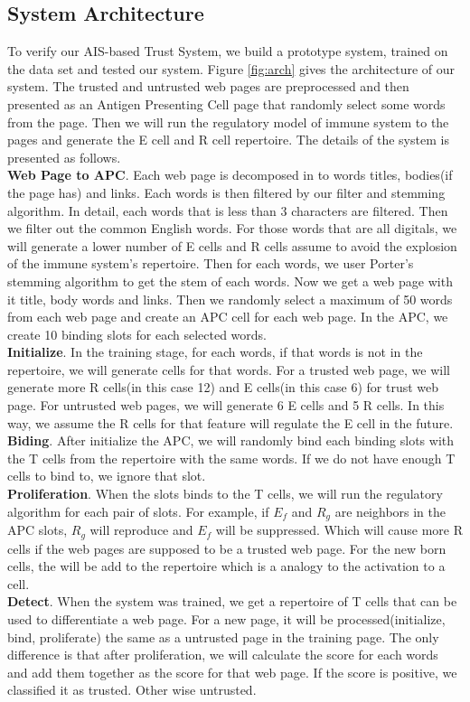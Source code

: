 \documentclass{llncs}
\begin{document}
\subsection{System Architecture}
To verify our AIS-based Trust System, we build a prototype system, trained on the data set and tested our system. Figure \ref{fig:arch} gives the architecture of our system. The trusted and untrusted web pages are preprocessed and then presented as an Antigen Presenting Cell page that randomly select some words from the page. Then we will run the regulatory model of immune system to the pages and generate the E cell and R cell repertoire. The details of the system is presented as follows.\\
\textbf{Web Page to APC}. Each web page is decomposed in to words titles, bodies(if the page has) and links. Each words is then filtered by our filter and stemming algorithm\cite{Porter}. In detail, each words that is less than 3 characters are filtered. Then we filter out the common English words\cite{Common}. For those words that are all digitals, we will generate a lower number of E cells and R cells assume to avoid the explosion of the immune system's repertoire. Then for each words, we user Porter's stemming algorithm to get the stem of each words. Now we get a web page with it title, body words and links. Then we randomly select a maximum of 50 words from each web page and create an APC cell for each web page. In the APC, we create 10 binding slots for each selected words. \\
\textbf{Initialize}. In the training stage, for each words, if that words is not in the repertoire, we will generate cells for that words. For a trusted web page, we will generate more R cells(in this case 12) and E cells(in this case 6) for trust web page. For untrusted web pages, we will generate 6 E cells and 5 R cells. In this way, we assume the R cells for that feature will regulate the E cell in the future. \\
\textbf{Biding}. After initialize the APC, we will randomly bind each binding slots with the T cells from the repertoire with the same words. If we do not have enough T cells to bind to, we ignore that slot. \\
\textbf{Proliferation}. When the slots binds to the T cells, we will run the regulatory algorithm for each pair of slots. For example, if $E_f$ and $R_g$ are neighbors in the APC slots, $R_g$ will reproduce and $E_f$ will be suppressed. Which will cause more R cells if the web pages are supposed to be a trusted web page. For the new born cells, the will be add to the repertoire which is a analogy to the activation to a cell. \\
\textbf{Detect}. When the system was trained, we get a repertoire of T cells that can be used to differentiate a web page. For a new page, it will be processed(initialize, bind, proliferate) the same as a untrusted page in the training page. The only difference is that after proliferation, we will calculate the score for each words and add them together as the score for that web page. If the score is positive, we classified it as trusted. Other wise untrusted. 
\end{document}
